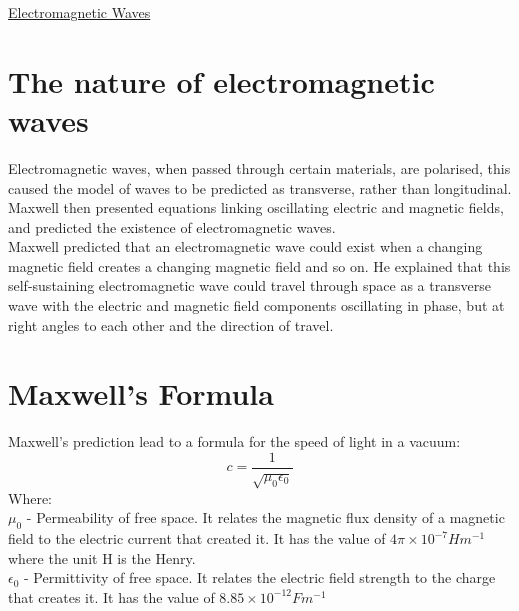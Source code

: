 \documentclass[12pt]{article}
\begin{document}
\begin{center}
\underline{\huge Electromagnetic Waves}
\end{center}
\section{The nature of electromagnetic waves}
Electromagnetic waves, when passed through certain materials, are polarised, this caused the model of waves to be predicted as transverse, rather than longitudinal.\\
Maxwell then presented equations linking oscillating electric and magnetic fields, and predicted the existence of electromagnetic waves.\\
Maxwell predicted that an electromagnetic wave could exist when a changing magnetic field creates a changing magnetic field and so on. He explained that this self-sustaining electromagnetic wave could travel through space as a transverse wave with the electric and magnetic field components oscillating in phase, but at right angles to each other and the direction of travel.
\section{Maxwell's Formula}
Maxwell's prediction lead to a formula for the speed of light in a vacuum:
$$c=\frac{1}{\sqrt{\mu_0\epsilon_0}}$$
Where:\\
$\mu_0$ - Permeability of free space. It relates the magnetic flux density of a magnetic field to the electric current that created it. It has the value of $4\pi\times10^{-7}Hm^{-1}$ where the unit H is the Henry.\\
$\epsilon_0$ - Permittivity of free space. It relates the electric field strength to the charge that creates it. It has the value of $8.85\times10^{-12}Fm^{-1}$
\end{document}
